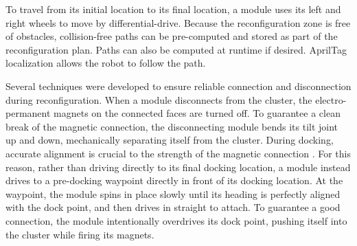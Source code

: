\documentclass[conference]{IEEEtran}
\begin{document}
To travel from its initial location to its final location, a module uses its left and right wheels to move by differential-drive.  Because the reconfiguration zone is free of obstacles, collision-free paths can be pre-computed and stored as part of the reconfiguration plan.  Paths can also be computed at runtime if desired.  AprilTag localization allows the robot to follow the path.

Several techniques were developed to ensure reliable connection and disconnection during reconfiguration.  When a module disconnects from the cluster, the electro-permanent magnets on the connected faces are turned off.  To guarantee a clean break of the magnetic connection, the disconnecting module bends its tilt joint up and down, mechanically separating itself from the cluster. During docking, accurate alignment is crucial to the strength of the magnetic connection \cite{tosun2016design}.  For this reason, rather than driving directly to its final docking location, a module instead drives to a pre-docking waypoint directly in front of its docking location.  At the waypoint, the module spins in place slowly until its heading is perfectly aligned with the dock point, and then drives in straight to attach. To guarantee a good connection, the module intentionally overdrives its dock point, pushing itself into the cluster while firing its magnets.
%
\end{document}
